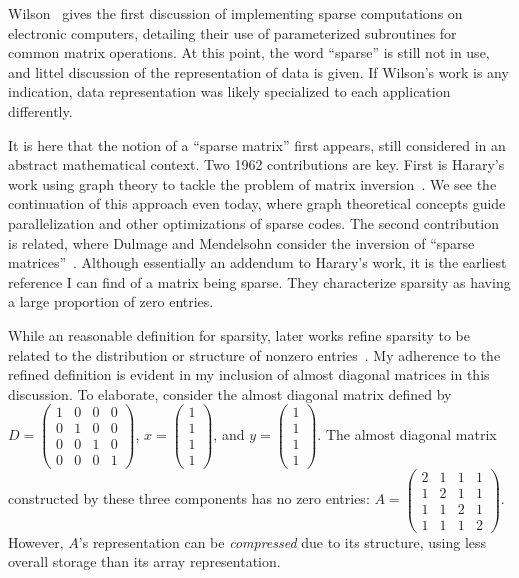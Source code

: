 Wilson~\cite{wilson1959solution} gives the first discussion of implementing sparse computations on electronic computers, detailing their use of parameterized subroutines for common matrix operations. 
At this point, the word \enquote{sparse} is still not in use, and littel discussion of the representation of data is given.
If Wilson's work is any indication, data representation was likely specialized to each application differently. 






It is here that the notion of a \enquote{sparse matrix} first appears, still considered in an abstract mathematical context. 
Two 1962 contributions are key.
First is Harary's work using graph theory to tackle the problem of matrix inversion~\cite{harary1962graph}.
We see the continuation of this approach even today, where graph theoretical concepts guide parallelization and other optimizations of sparse codes.
The second contribution is related, where Dulmage and Mendelsohn consider the inversion of \enquote{sparse matrices}~\cite{dulmage1962inversion}.
Although essentially an addendum to Harary's work, it is the earliest reference I can find of a matrix being sparse.
They characterize sparsity as having a large proportion of zero entries.

While an reasonable definition for sparsity, later works refine sparsity to be related to the distribution or structure of nonzero entries~\cite{duff1977survey}.
My adherence to the refined definition is evident in my inclusion of almost diagonal matrices in this discussion. 
To elaborate, consider the almost diagonal matrix defined by $D=\begin{pmatrix}
  1 & 0 & 0 & 0\\
  0 & 1 & 0 & 0\\
  0 & 0 & 1 & 0 \\
  0 & 0 & 0 & 1
\end{pmatrix}$,
$x=\begin{pmatrix}
  1 \\
  1 \\
  1 \\
  1
\end{pmatrix}$, 
and $y=\begin{pmatrix}
  1 \\
  1 \\
  1 \\
  1
\end{pmatrix}$.
The almost diagonal matrix constructed by these three components has no zero entries: $A=\begin{pmatrix}
  2 & 1 & 1 & 1 \\
  1 & 2 & 1 & 1 \\
  1 & 1 & 2 & 1 \\
  1 & 1 & 1 & 2
\end{pmatrix}$.
However, $A$'s representation can be \textit{compressed} due to its structure, using less overall storage than its array representation.


